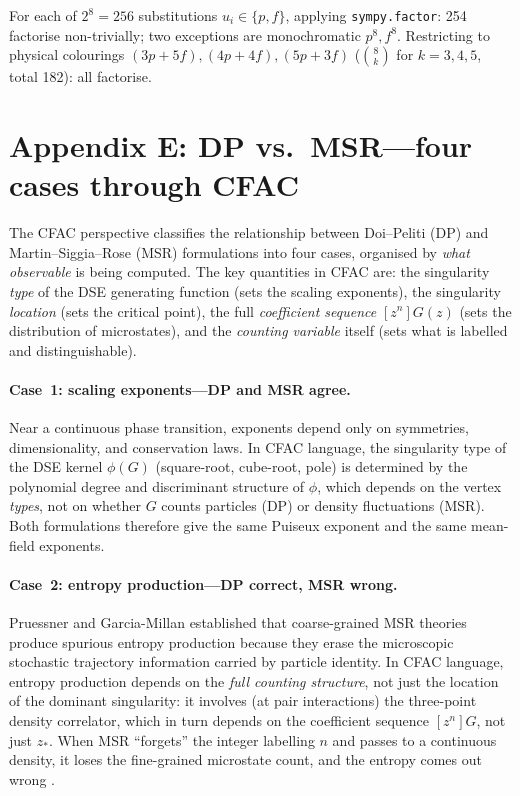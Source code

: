 \documentclass[11pt,a4paper]{article}
\theoremstyle{plain}
\begin{document}
For each of $2^8 = 256$ substitutions $u_i \in \{p, f\}$,
applying \texttt{sympy.factor}: 254 factorise non-trivially; two
exceptions are monochromatic $p^8, f^8$.  Restricting to physical
colourings $(3p+5f), (4p+4f), (5p+3f)$
($\binom{8}{k}$ for $k = 3, 4, 5$, total 182): all factorise.

\section*{Appendix E: DP vs.\ MSR---four cases through CFAC}
\label{app:dp-vs-msr}

The CFAC perspective classifies the relationship between
Doi--Peliti (DP) and Martin--Siggia--Rose (MSR) formulations into
four cases, organised by \emph{what observable} is being
computed.  The key quantities in CFAC are: the singularity
\emph{type} of the DSE generating function (sets the scaling
exponents), the singularity \emph{location} (sets the critical
point), the full \emph{coefficient sequence} $[z^n]G(z)$ (sets
the distribution of microstates), and the \emph{counting
variable} itself (sets what is labelled and distinguishable).

\paragraph{Case~1: scaling exponents---DP and MSR agree.}
Near a continuous phase transition, exponents depend only on
symmetries, dimensionality, and conservation laws.  In CFAC
language, the singularity type of the DSE kernel $\phi(G)$
(square-root, cube-root, pole) is determined by the polynomial
degree and discriminant structure of $\phi$, which depends on
the vertex \emph{types}, not on whether $G$ counts particles
(DP) or density fluctuations (MSR).  Both formulations therefore
give the same Puiseux exponent and the same mean-field exponents.

\paragraph{Case~2: entropy production---DP correct, MSR wrong.}
Pruessner and Garcia-Millan \cite{PruessnerGarciaMillan2025}
established that coarse-grained MSR theories produce spurious
entropy production because they erase the microscopic stochastic
trajectory information carried by particle identity.  In CFAC
language, entropy production depends on the \emph{full counting
structure}, not just the location of the dominant singularity: it
involves (at pair interactions) the three-point density correlator,
which in turn depends on the coefficient sequence $[z^n]G$, not
just $z_*$.  When MSR ``forgets'' the integer labelling $n$ and
passes to a continuous density, it loses the fine-grained
microstate count, and the entropy comes out wrong
\citep{Bothe2023}.
\end{document}
